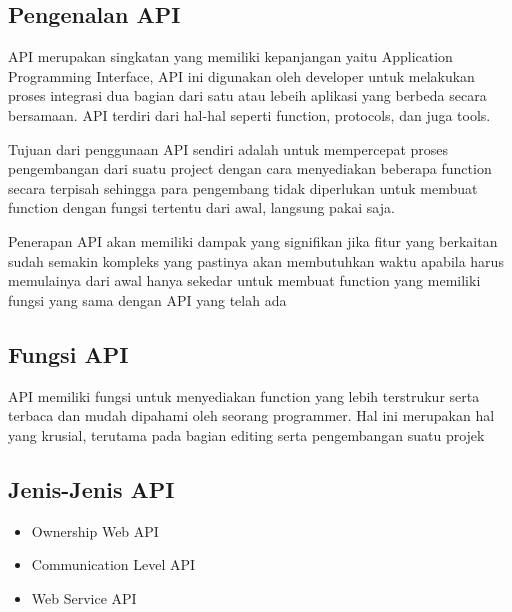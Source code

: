 \begin{enumerate}
\subsection{Pengenalan API}
API merupakan singkatan yang memiliki kepanjangan yaitu Application Programming Interface, API ini digunakan oleh developer untuk melakukan proses integrasi dua bagian dari satu atau lebeih aplikasi yang berbeda secara bersamaan. API terdiri dari hal-hal seperti function, protocols, dan juga tools. 

Tujuan dari penggunaan API sendiri adalah untuk mempercepat proses pengembangan dari suatu project dengan cara menyediakan beberapa function secara terpisah sehingga para pengembang tidak diperlukan untuk membuat function dengan fungsi tertentu dari awal, langsung pakai saja.

Penerapan API akan memiliki dampak yang signifikan jika fitur yang berkaitan sudah semakin kompleks yang pastinya akan membutuhkan waktu apabila harus memulainya dari awal hanya sekedar untuk membuat function yang memiliki fungsi yang sama dengan API yang telah ada

\subsection{Fungsi API}
API memiliki fungsi untuk menyediakan function yang lebih terstrukur serta terbaca dan mudah dipahami oleh seorang programmer. Hal ini merupakan hal yang krusial, terutama pada bagian editing serta pengembangan suatu projek

\subsection{Jenis-Jenis API}
\begin{itemize}
	\item Ownership Web API
	\item Communication Level API
	\item Web Service API
\end{itemize}
\end{enumerate}

